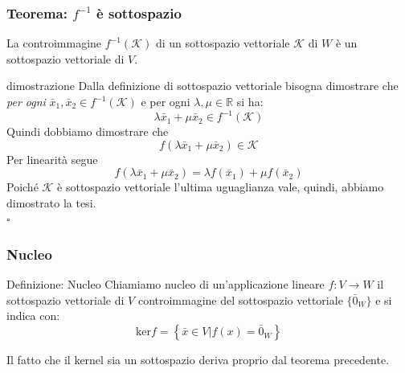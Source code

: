 \documentclass[x11names]{article}
\newcommand*{\QEDB}{\null\nobreak\hfill\ensuremath{\square}}%
\begin{document}
\begin{center}
	\colorbox{myred}{\begin{minipage}{5.75in}
			\begin{redes}{}
				
			\subsubsection{Teorema: $f^{-1}$ è sottospazio}
			La controimmagine $f^{-1}(\mathcal{K})$ di un sottospazio vettoriale $\mathcal{K}$ di $W$ è un sottospazio vettoriale di $V$.	
			\end{redes}
	\end{minipage}}        
\end{center}
				

\begin{es}{dimostrazione}
	Dalla definizione di sottospazio vettoriale bisogna dimostrare che \textit{per ogni} $\bar{x}_{1},\bar{x}_{2} \in f^{-1}(\mathcal{K})$ e per ogni $\lambda, \mu \in \mathbb{R}$ si ha:
	\[
	\lambda \bar{x}_{1} + \mu \bar{x}_{2} \in f^{-1}(\mathcal{K})
	\]
	Quindi dobbiamo dimostrare che 
	\[
	f\left(\lambda\bar{x}_{1} + \mu \bar{x}_{2}\right) \in \mathcal{K}
	\]
	Per linearità segue
	\[
	f\left(\lambda\bar{x}_{1} + \mu \bar{x}_{2}\right) = \lambda f\left(\bar{x}_{1}\right) + \mu f\left(\bar{x}_{2}\right)
	\]
	Poiché $\mathcal{K}$ è sottospazio vettoriale l'ultima uguaglianza vale, quindi, abbiamo dimostrato la tesi.
	\\
	\QEDB
\end{es}

\subsubsection{Nucleo}
	\begin{center}
	\colorbox{myblue}{\begin{minipage}{5.75in}
			\begin{blues}{Definizione: Nucleo}
				Chiamiamo nucleo di un'applicazione lineare $f:V\to W$ il sottospazio vettoriale di $V$ controimmagine del sottospazio vettoriale $\{\bar{0}_{W}\}$ e si indica con:
				\[
				\text{ker}f = \left\{\bar{x} \in V | f(x) = \bar{0}_{W}\right\}
				\]
			\end{blues}
	\end{minipage}}       
\end{center}
Il fatto che il kernel sia un sottospazio deriva proprio dal teorema precedente.
\end{document}
